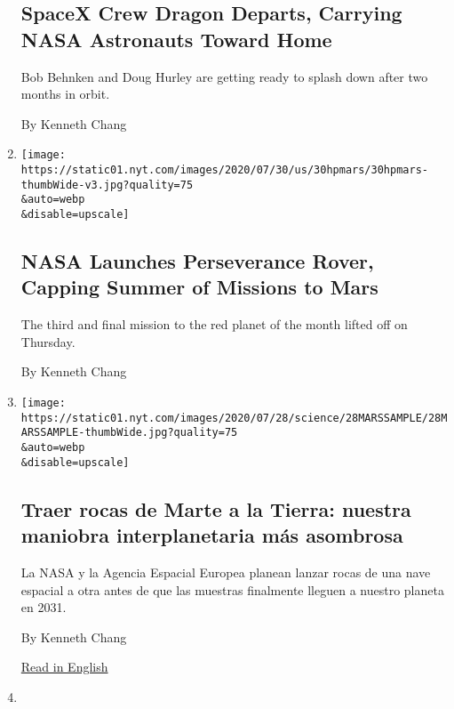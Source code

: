 \begin{enumerate}
{  \subsection{SpaceX Crew Dragon Departs, Carrying NASA Astronauts
  Toward
  Home}\label{spacex-crew-dragon-departs-carrying-nasa-astronauts-toward-home}}

  Bob Behnken and Doug Hurley are getting ready to splash down after two
  months in orbit.

  By Kenneth Chang
\item
  \href{/2020/07/30/science/nasa-mars-launch.html}{}

  \texttt{[image: https://static01.nyt.com/images/2020/07/30/us/30hpmars/30hpmars-thumbWide-v3.jpg?quality=75\\\&auto=webp\\\&disable=upscale]}

  \hypertarget{nasa-launches-perseverance-rover-capping-summer-of-missions-to-mars}{%
  \subsection{NASA Launches Perseverance Rover, Capping Summer of
  Missions to
  Mars}\label{nasa-launches-perseverance-rover-capping-summer-of-missions-to-mars}}

  The third and final mission to the red planet of the month lifted off
  on Thursday.

  By Kenneth Chang
\item
  \href{/es/2020/07/29/espanol/ciencia-y-tecnologia/mision-marte-nasa.html}{}

  \texttt{[image: https://static01.nyt.com/images/2020/07/28/science/28MARSSAMPLE/28MARSSAMPLE-thumbWide.jpg?quality=75\\\&auto=webp\\\&disable=upscale]}

  \hypertarget{traer-rocas-de-marte-a-la-tierra-nuestra-maniobra-interplanetaria-muxe1s-asombrosa}{%
  \subsection{Traer rocas de Marte a la Tierra: nuestra maniobra
  interplanetaria más
  asombrosa}\label{traer-rocas-de-marte-a-la-tierra-nuestra-maniobra-interplanetaria-muxe1s-asombrosa}}

  La NASA y la Agencia Espacial Europea planean lanzar rocas de una nave
  espacial a otra antes de que las muestras finalmente lleguen a nuestro
  planeta en 2031.

  By Kenneth Chang

  \href{https://www.nytimes.com/2020/07/28/science/mars-sample-return-mission.html}{Read
  in English}
\item
  \href{/2020/07/29/science/nasa-mars-perseverance-rover.html}{}


\end{enumerate}

